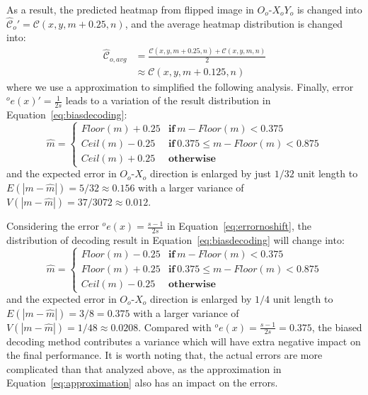 \documentclass[10pt,journal,compsoc]{IEEEtran}
\begin{document}
As a result, the predicted heatmap from flipped image in $O_o\text{-}X_oY_o$ is changed into $\hat{\mathcal{C}}_o' = \mathcal{C}(x,y,m+0.25,n) $, and the average heatmap distribution is changed into:
\begin{equation}
\label{eq:approximation}
    \begin{split}
    \hat{\mathcal{C}}_{o,avg}   &= \frac{\mathcal{C}(x,y,m+0.25,n) + \mathcal{C}(x,y,m,n)}{2}\\
                                 &\approx \mathcal{C}(x,y,m+0.125,n)
    \end{split}
\end{equation}
where we use a approximation to simplified the following analysis. Finally, error ${^o}e(x)' = \frac{1}{2s}$ leads to a variation of the result distribution in Equation~\ref{eq:biasdecoding}:
\begin{equation}
    \hat{m}= \begin{cases}
		Floor(m) + 0.25  \!\!  & \textbf{if} \ m-Floor(m)<0.375\\
		Ceil(m) - 0.25  \!\!  & \textbf{if} \ 0.375\leq m-Floor(m)<0.875 \\
        Ceil(m) + 0.25  \!\!  & \textbf{otherwise}
	\end{cases}
\end{equation}
and the expected error in $O_o\text{-}X_o$ direction is enlarged by just $1/32$ unit length to $E(|m  - \hat{m}|) = 5/32 \approx 0.156$ with a larger variance of $V(|m  - \hat{m}|) = 37/3072 \approx 0.012$. 

Considering the error ${^o}e(x) = \frac{s-1}{2s}$ in Equation~\ref{eq:errornoshift}, the distribution of decoding result in Equation~\ref{eq:biasdecoding} will change into:
\begin{equation}
    \hat{m}= \begin{cases}
		Floor(m) - 0.25  \!\!  & \textbf{if} \ m-Floor(m)<0.375\\
		Floor(m) + 0.25  \!\!  & \textbf{if} \ 0.375\leq m-Floor(m)<0.875 \\
        Ceil(m) - 0.25  \!\!  & \textbf{otherwise}
	\end{cases}
\end{equation}
and the expected error in $O_o\text{-}X_o$ direction is enlarged by $1/4$ unit length to $E(|m  - \hat{m}|) = 3/8 = 0.375$ with a larger variance of $V(|m  - \hat{m}|) = 1/48 \approx 0.0208$. Compared with ${^o}e(x) = \frac{s-1}{2s} = 0.375$, the biased decoding method contributes a variance which will have extra negative impact on the final performance. It is worth noting that, the actual errors are more complicated than that analyzed above, as the approximation in Equation~\ref{eq:approximation} also has an impact on the errors.
\end{document}
